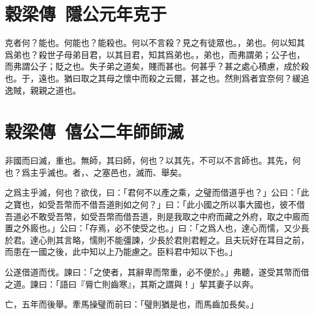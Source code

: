\section[鄭伯克段于鄢\quad{\small 穀梁傳 隱公元年}]{{\normalsize 穀梁傳\ 隱公元年}\quad {}克于}
克者何？能也。何能也？能殺也。何以不言殺？見之有徒眾也。，弟也。何以知其爲弟也？殺世子母弟目君，以其目君，知其爲弟也。，弟也，而弗謂弟；公子也，而弗謂公子；貶之也。失子弟之道矣，賤而甚也。何甚乎？甚之處心積慮，成於殺也。于，遠也。猶曰取之其母之懷中而殺之云爾，甚之也。然則爲者宜奈何？緩追逸賊，親親之道也。

\section[虞師晉師滅夏陽\quad{\small 穀梁傳 僖公二年}]{{\normalsize 穀梁傳\ 僖公二年}\quad {}師師滅}
非國而曰滅，重也。無師，其曰師，何也？以其先，不可以不言師也。其先，何也？爲主乎滅也。者，、之塞邑也，滅而、舉矣。

之爲主乎滅，何也？欲伐，曰：「君何不以產之乘，之璧而借道乎也？」公曰：「此之寶也，如受吾幣而不借吾道則如之何？」曰：「此小國之所以事大國也，彼不借吾道必不敢受吾幣，如受吾幣而借吾道，則是我取之中府而藏之外府，取之中廄而置之外廄也。」公曰：「存焉，必不使受之也。」曰：「之爲人也，達心而懦，又少長於君。達心則其言略，懦則不能彊諫，少長於君則君輕之。且夫玩好在耳目之前，而患在一國之後，此中知以上乃能慮之。臣料君中知以下也。」

公遂借道而伐。諫曰：「之使者，其辭卑而幣重，必不便於。」弗聽，遂受其幣而借之道。諫曰：「語曰『脣亡則齒寒』，其斯之謂與！」挈其妻子以奔。

亡，五年而後舉。牽馬操璧而前曰：「璧則猶是也，而馬齒加長矣。」


